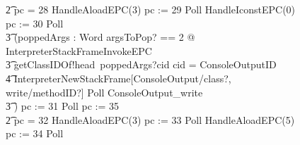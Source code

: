 \begin{figure}[tp!]
{\begin{circus}
    \t2 {} \circelse pc = 28 \circthen HandleAloadEPC(3) \circseq pc := 29 \circseq Poll \circseq HandleIconstEPC(0) \circseq pc := 30 \circseq Poll \circseq \\
    \t3 (\circvar poppedArgs : Word \circspot \lschexpract \exists argsToPop? == 2 @ InterpreterStackFrameInvokeEPC \rschexpract \circseq \\
    \t3 getClassIDOf!head~poppedArgs?cid \then \circif cid = ConsoleOutputID \circthen {} \\
    \t4 \lschexpract InterpreterNewStackFrame[ConsoleOutput/class?, write/methodID?] \rschexpract \circseq  Poll \circseq ConsoleOutput\_write \\
    \t3 \circfi) \circseq pc := 31 \circseq Poll \circseq pc := 35 \\
    \t2 {} \circelse pc = 32 \circthen HandleAloadEPC(3) \circseq pc := 33 \circseq Poll \circseq HandleAloadEPC(5) \circseq pc := 34 \circseq Poll \circseq \\

\end{circus}}
\end{figure}
